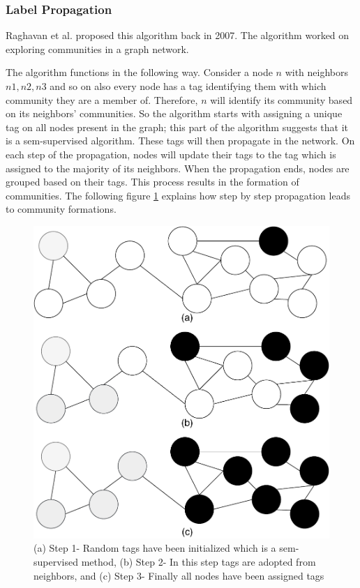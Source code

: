 \documentclass[journal,twoside,web]{ieeecolor}
\begin{document}
\subsubsection{Label Propagation}
Raghavan et al. proposed this algorithm back in 2007\cite{16}. The algorithm worked on exploring communities in a graph network. 

The algorithm functions in the following way. Consider a node $n$ with neighbors $n1, n2, n3$ and so on also every node has a tag identifying them with which community they are a member of. Therefore, $n$ will identify its community based on its neighbors' communities. So the algorithm starts with assigning a unique tag on all nodes present in the graph; this part of the algorithm suggests that it is a sem-supervised algorithm. These tags will then propagate in the network. On each step of the propagation, nodes will update their tags to the tag which is assigned to the majority of its neighbors. When the propagation ends, nodes are grouped based on their tags. This process results in the formation of communities. The following figure \ref{fig6} explains how step by step propagation leads to community formations.

\begin{figure}[!h]
    \centerline{\includegraphics[scale=0.35]{figures/label_propagation.pdf}}
    \caption{(a) Step 1- Random tags have been initialized which is a sem-supervised method, (b) Step 2- In this step tags are adopted from neighbors, and (c) Step 3- Finally all nodes have been assigned tags}
    \label{fig6}
\end{figure}
\end{document}
